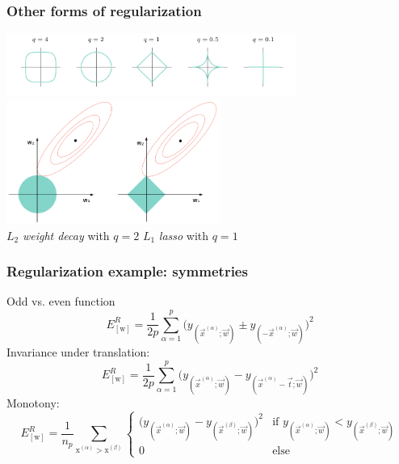 \begin{frame}\frametitle{Other forms of regularization}
	\begin{center}
		\includegraphics[width=9.5cm]{img/QnormPenalties_clean.png} \\
		\includegraphics[width=7cm]{img/RegularizationTypesIntersect_clean.png} \\[-2mm]
		{ \footnotesize $L_2$ {\em weight decay} with $q=2$ 
			\hspace{1cm} $L_1$ {\em lasso} with $q=1$ \hspace{1cm} $ $}
	\end{center}

\end{frame}


\begin{frame}\frametitle{Regularization example: symmetries} 
	Odd vs. even function
	\begin{equation*}
		E_{[\mathrm{w}]}^R = \frac{1}{2p} \sum_{\alpha = 1}^p 
			\Big( y_{(\vec{x}^{(\alpha)}; \vec{w})} 
				\pm y_{(-\vec{x}^{(\alpha)}; \vec{w})} 
			\Big)^2
	\end{equation*}
	\pause
	Invariance under translation:
	\begin{equation*}
		E_{[\mathrm{w}]}^R = \frac{1}{2p} \sum_{\alpha = 1}^p 
			\Big( y_{(\vec{x}^{(\alpha)}; \vec{w})} 
				- y_{(\vec{x}^{(\alpha)} - \vec{t}; \vec{w})} 
			\Big)^2
	\end{equation*}
	\pause
	Monotony:
	\begin{equation*}
		E_{[\mathrm{w}]}^R = \frac{1}{n_p} \sum_{
			\mathrm{x}^{(\alpha)} > \mathrm{x}^{(\beta)}} 
		\left \{
		\begin{array}{cl}
			\Big( y_{(\vec{x}^{(\alpha)}; \vec{w})} - 
				y_{(\vec{x}^{(\beta)}; \vec{w})} \Big)^2  
			& \text{if } y_{(\vec{x}^{(\alpha)}; \vec{w})} < 
				y_{(\vec{x}^{(\beta)}; \vec{w})} \\[2mm] 
			0 & \text{else}
		\end{array} \right.
	\end{equation*}
\end{frame}

